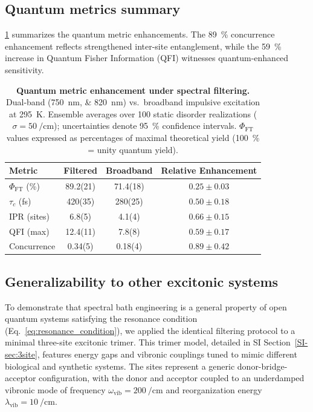 \documentclass[journal=jpcl,manuscript=letter]{achemso}
\begin{document}
\subsection{Quantum metrics summary}

\cref{tab:quantum_metrics} summarizes the quantum metric enhancements. The \SI{89}{\percent} concurrence enhancement reflects strengthened inter-site entanglement, while the \SI{59}{\percent} increase in Quantum Fisher Information (QFI) witnesses quantum-enhanced sensitivity.

\begin{table}[t]
\centering
\caption{\textbf{Quantum metric enhancement under spectral filtering.} Dual-band (\SIlist{750;820}{\nano\meter}) vs.\ broadband impulsive excitation at \SI{295}{\kelvin}. Ensemble averages over \num{100} static disorder realizations ($\sigma = \SI{50}{\per\centi\meter}$); uncertainties denote \SI{95}{\percent} confidence intervals. $\Phi_{\mathrm{FT}}$ values expressed as percentages of maximal theoretical yield (\SI{100}{\percent} = unity quantum yield).}
\label{tab:quantum_metrics}
\begin{tabular}{lccc}
\toprule
\textbf{Metric} & \textbf{Filtered} & \textbf{Broadband} & \textbf{Relative Enhancement} \\
\midrule
$\Phi_{\mathrm{FT}}$ (\si{\percent}) & 89.2(21) & 71.4(18) & $0.25 \pm 0.03$ \\
$\tau_c$ (\si{\femto\second}) & 420(35) & 280(25) & $0.50 \pm 0.18$ \\
IPR (sites) & 6.8(5) & 4.1(4) & $0.66 \pm 0.15$ \\
QFI (max) & 12.4(11) & 7.8(8) & $0.59 \pm 0.17$ \\
Concurrence & 0.34(5) & 0.18(4) & $0.89 \pm 0.42$ \\
\bottomrule
\end{tabular}
\end{table}

\subsection{Generalizability to other excitonic systems}

To demonstrate that spectral bath engineering is a general property of open quantum systems satisfying the resonance condition (Eq.~\cref{eq:resonance_condition}), we applied the identical filtering protocol to a minimal three-site excitonic trimer. This trimer model, detailed in SI Section~\ref{SI-sec:3site}, features energy gaps and vibronic couplings tuned to mimic different biological and synthetic systems. The sites represent a generic donor-bridge-acceptor configuration, with the donor and acceptor coupled to an underdamped vibronic mode of frequency $\omega_{\mathrm{vib}} = \SI{200}{\per\centi\meter}$ and reorganization energy $\lambda_{\mathrm{vib}} = \SI{10}{\per\centi\meter}$.
\end{document}
